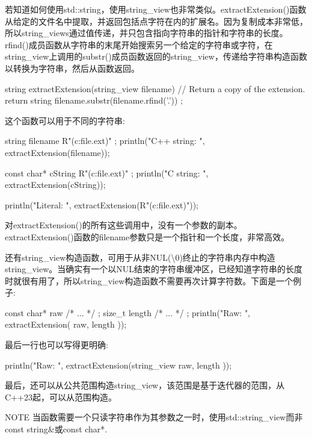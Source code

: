 若知道如何使用std::string，使用string\_view也非常类似。extractExtension()函数从给定的文件名中提取，并返回包括点字符在内的扩展名。因为复制成本非常低，所以string\_views通过值传递，并只包含指向字符串的指针和字符串的长度。rfind()成员函数从字符串的末尾开始搜索另一个给定的字符串或字符，在string\_view上调用的substr()成员函数返回的string\_view，传递给字符串构造函数以转换为字符串，然后从函数返回。

\begin{cpp}
string extractExtension(string_view filename)
{
    // Return a copy of the extension.
    return string { filename.substr(filename.rfind('.')) };
}
\end{cpp}

这个函数可以用于不同的字符串:

\begin{cpp}
string filename { R"(c:\temp\my file.ext)" };
println("C++ string: {}", extractExtension(filename));

const char* cString { R"(c:\temp\my file.ext)" };
println("C string: {}", extractExtension(cString));

println("Literal: {}", extractExtension(R"(c:\temp\my file.ext)"));
\end{cpp}

对extractExtension()的所有这些调用中，没有一个参数的副本。extractExtension()函数的filename参数只是一个指针和一个长度，非常高效。

还有string\_view构造函数，可用于从非NUL(\textbackslash{}0)终止的字符串内存中构造string\_view。当确实有一个以NUL结束的字符串缓冲区，已经知道字符串的长度时就很有用了，所以string\_view构造函数不需要再次计算字符数。下面是一个例子:

\begin{cpp}
const char* raw { /* ... */ };
size_t length { /* ... */ };
println("Raw: {}", extractExtension({ raw, length }));
\end{cpp}

最后一行也可以写得更明确:

\begin{cpp}
println("Raw: {}", extractExtension(string_view { raw, length }));
\end{cpp}

最后，还可以从公共范围构造string\_view，该范围是基于迭代器的范围，从C++23起，可以从范围构造。

\begin{myNotic}{NOTE}
当函数需要一个只读字符串作为其参数之一时，使用std::string\_view而非const string\&或const char*.
\end{myNotic}

